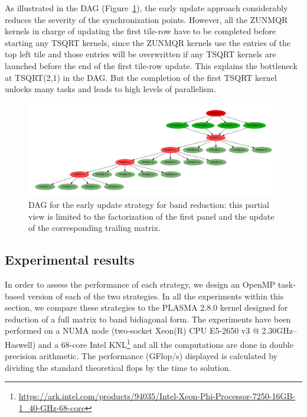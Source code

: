 As illustrated in the DAG (Figure~\ref{fig:dag_tile}), the early
update approach considerably reduces the severity of the
synchronization points.  However, all the ZUNMQR kernels in charge of
updating the first tile-row have to be completed before starting any
TSQRT kernels, since the ZUNMQR kernels use the entries of the top
left tile and those entries will be overwritten if any TSQRT kernels
are launched before the end of the first tile-row update.  This
explains the bottleneck at TSQRT(2,1) in the DAG.  But the completion
of the first TSQRT kernel unlocks many tasks and leads to high levels
of parallelism.


\begin{figure}[h!]
  \begin{center}
    \includegraphics[width=1\textwidth]{fig/dag_tile}
  \end{center}
  \caption{DAG for the early update strategy for band reduction:
    this partial view is limited to the factorization of the first panel and
    the update of the corresponding trailing matrix.}
  \label{fig:dag_tile}
\end{figure}

\subsection{Experimental results}
In order to assess the performance of each strategy, we design an
OpenMP task-based version of each of the two strategies.  In all the
experiments within this section, we compare these strategies to the
PLASMA 2.8.0 kernel designed for reduction of a full matrix to band
bidiagonal form.  The experiments have been performed on a NUMA node
(two-socket Xeon(R) CPU E5-2650 v3 @ 2.30GHz--Haswell) and a 68-core
Intel
KNL\footnote{\url{https://ark.intel.com/products/94035/Intel-Xeon-Phi-Processor-7250-16GB-1\_40-GHz-68-core}}
and all the computations are done in double precision arithmetic.  The
performance (GFlop/s) displayed is calculated by dividing the standard
theoretical flops by the time to solution.

